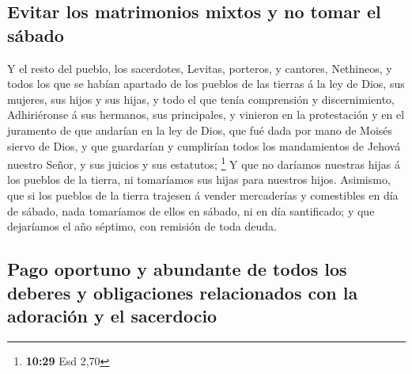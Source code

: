 \hypertarget{evitar-los-matrimonios-mixtos-y-no-tomar-el-suxe1bado}{%
\subsection{Evitar los matrimonios mixtos y no tomar el
sábado}\label{evitar-los-matrimonios-mixtos-y-no-tomar-el-suxe1bado}}

 Y el resto del pueblo, los sacerdotes, Levitas, porteros,
y cantores, Nethineos, y todos los que se habían apartado de los pueblos
de las tierras á la ley de Dios, sus mujeres, sus hijos y sus hijas, y
todo el que tenía comprensión y discernimiento, 
Adhiriéronse á sus hermanos, sus principales, y vinieron en la
protestación y en el juramento de que andarían en la ley de Dios, que
fué dada por mano de Moisés siervo de Dios, y que guardarían y
cumplirían todos los mandamientos de Jehová nuestro Señor, y sus juicios
y sus estatutos; \footnote{\textbf{10:29} Esd 2,70}  Y que
no daríamos nuestras hijas á los pueblos de la tierra, ni tomaríamos sus
hijas para nuestros hijos.  Asimismo, que si los pueblos de
la tierra trajesen á vender mercaderías y comestibles en día de sábado,
nada tomaríamos de ellos en sábado, ni en día santificado; y que
dejaríamos el año séptimo, con remisión de toda deuda.

\hypertarget{pago-oportuno-y-abundante-de-todos-los-deberes-y-obligaciones-relacionados-con-la-adoraciuxf3n-y-el-sacerdocio}{%
\subsection{Pago oportuno y abundante de todos los deberes y
obligaciones relacionados con la adoración y el
sacerdocio}\label{pago-oportuno-y-abundante-de-todos-los-deberes-y-obligaciones-relacionados-con-la-adoraciuxf3n-y-el-sacerdocio}}

